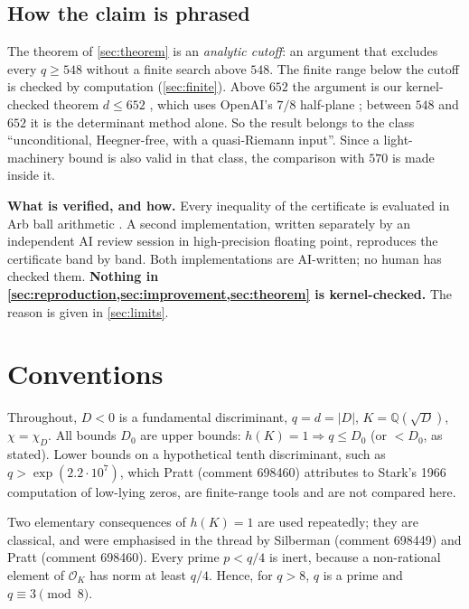 \documentclass[11pt]{article}
\theoremstyle{definition}
\newcommand{\Q}{\mathbb{Q}}
\newcommand{\OK}{\mathcal{O}_K}
\begin{document}
\subsection{How the claim is phrased}\label{sec:framing}
The theorem of \cref{sec:theorem} is an \emph{analytic cutoff}: an argument that excludes every $q \ge 548$ without a finite search above $548$. The finite range below the cutoff is checked by computation (\cref{sec:finite}). Above $652$ the argument is our kernel-checked theorem $d \le 652$ \cite{CN1paper}, which uses OpenAI's $7/8$ half-plane \cite{OAIqrh}; between $548$ and $652$ it is the determinant method alone. So the result belongs to the class ``unconditional, Heegner-free, with a quasi-Riemann input''. Since a light-machinery bound is also valid in that class, the comparison with $570$ is made inside it.

\textbf{What is verified, and how.} Every inequality of the certificate is evaluated in Arb ball arithmetic \cite{Arb}. A second implementation, written separately by an independent AI review session in high-precision floating point, reproduces the certificate band by band. Both implementations are AI-written; no human has checked them. \textbf{Nothing in \cref{sec:reproduction,sec:improvement,sec:theorem} is kernel-checked.} The reason is given in \cref{sec:limits}.

\section{Conventions}\label{sec:conventions}
Throughout, $D<0$ is a fundamental discriminant, $q = d = |D|$, $K = \Q(\sqrt D)$, $\chi = \chi_D$. All bounds $D_0$ are upper bounds: $h(K) = 1 \Rightarrow q \le D_0$ (or $< D_0$, as stated). Lower bounds on a hypothetical tenth discriminant, such as $q > \exp(2.2\cdot10^7)$, which Pratt (comment 698460) attributes to Stark's 1966 computation of low-lying zeros, are finite-range tools and are not compared here.

Two elementary consequences of $h(K) = 1$ are used repeatedly; they are classical, and were emphasised in the thread by Silberman (comment 698449) and Pratt (comment 698460). Every prime $p < q/4$ is inert, because a non-rational element of $\OK$ has norm at least $q/4$. Hence, for $q > 8$, $q$ is a prime and $q \equiv 3 \pmod 8$.
\end{document}

